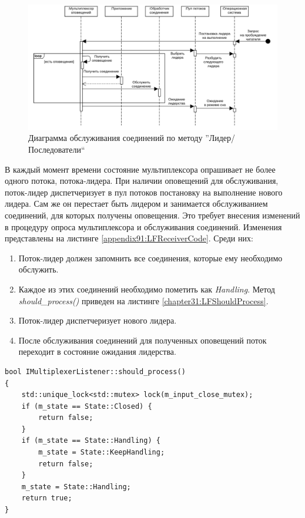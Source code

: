 \begin{figure}[!h]
\caption{Диаграмма обслуживания соединений по методу ''Лидер/Последователи``}
\label{chapter31:LFMuxSchema}
\includegraphics[width=\textwidth]{../../graphics/schemes/LFMuxSequence}
\end{figure}

В каждый момент времени состояние мультиплексора опрашивает не более одного потока, потока-лидера. При наличии оповещений для обслуживания, поток-лидер диспетчеризует в пул потоков постановку на выполнение нового лидера. Сам же он перестает быть лидером и занимается обслуживанием соединений, для которых получены оповещения. Это требует внесения изменений в процедуру опроса мультиплексора и обслуживания соединений. Изменения представлены на листинге \ref{appendix91:LFReceiverCode}. Среди них:
\begin{enumerate}
\item Поток-лидер должен запомнить все соединения, которые ему необходимо обслужить.
\item Каждое из этих соединений необходимо пометить как \textit{Handling}. Метод \textit{should\_process()} приведен на листинге \ref{chapter31:LFShouldProcess}.
\item Поток-лидер диспетчеризует нового лидера.
\item После обслуживания соединений для полученных оповещений поток переходит в состояние ожидания лидерства.
\end{enumerate}

\begin{lstlisting}[float=!h,caption={Процедура подготовления соединения к обслуживанию в модели обслуживания соединений ''Лидер/Последователи``},label={chapter31:LFShouldProcess},frame=tlrb]
bool IMultiplexerListener::should_process()
{
    std::unique_lock<std::mutex> lock(m_input_close_mutex);
    if (m_state == State::Closed) {
        return false;
    }
    if (m_state == State::Handling) {
        m_state = State::KeepHandling;
        return false;
    }
    m_state = State::Handling;
    return true;
}
\end{lstlisting}

